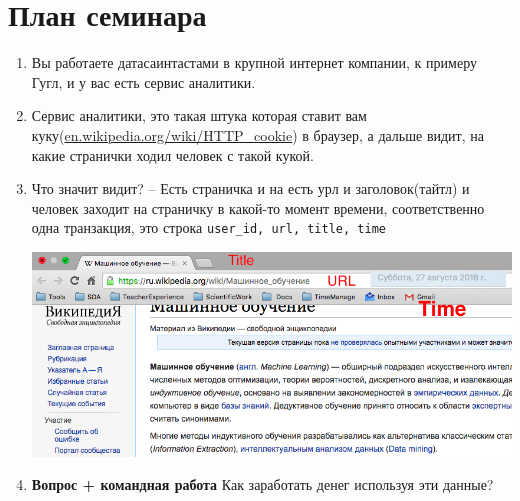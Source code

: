 \documentclass[a4paper, 12pt]{article}
\begin{document}
\section*{План семинара}
\begin{enumerate}
\item Вы работаете датасаинтастами в крупной интернет компании, к примеру Гугл, и у вас есть сервис аналитики. 
\item  Сервис аналитики, это такая штука которая ставит вам куку(\href{https://en.wikipedia.org/wiki/HTTP_cookie}{en.wikipedia.org/wiki/HTTP\_cookie}) в браузер, а дальше видит, на какие странички ходил человек с такой кукой.
\item  Что значит видит?  -- Есть страничка и на есть урл и заголовок(тайтл) и человек заходит на страничку в какой-то момент времени, соответственно одна транзакция, это строка \texttt{user\_id, url, title, time}

\begin{center}
	\includegraphics[scale=0.4]{br}
\end{center}

\item \textbf{Вопрос + командная работа} Как заработать денег используя эти данные?


\end{enumerate}
\end{document}

